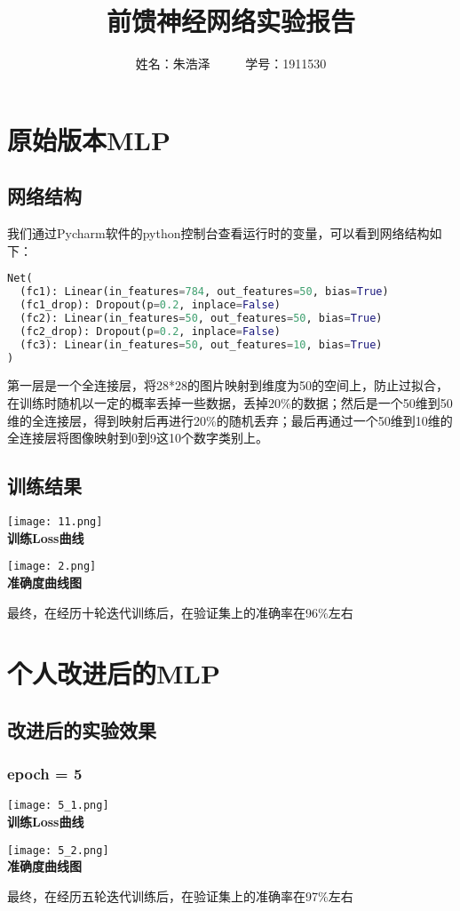 \documentclass{article}
\begin{document}
\title{\textbf{前馈神经网络实验报告}}
\author{姓名：朱浩泽 \ \ \ \ \ 学号：1911530}
\maketitle
\section{原始版本MLP}
\large 
\subsection{网络结构}
我们通过Pycharm软件的python控制台查看运行时的变量，可以看到网络结构如下：
\begin{lstlisting}[language = python]
Net(
  (fc1): Linear(in_features=784, out_features=50, bias=True)
  (fc1_drop): Dropout(p=0.2, inplace=False)
  (fc2): Linear(in_features=50, out_features=50, bias=True)
  (fc2_drop): Dropout(p=0.2, inplace=False)
  (fc3): Linear(in_features=50, out_features=10, bias=True)
)
\end{lstlisting}
第一层是一个全连接层，将28*28的图片映射到维度为50的空间上，防止过拟合，在训练时随机以一定的概率丢掉一些数据，丢掉20\%的数据；然后是一个50维到50维的全连接层，得到映射后再进行20\%的随机丢弃；最后再通过一个50维到10维的全连接层将图像映射到0到9这10个数字类别上。
\subsection{训练结果}
\begin{center}
   \texttt{[image: 11.png]}\\
   \normalsize{\textbf{训练Loss曲线}}
\end{center}
\begin{center}
   \texttt{[image: 2.png]}\\
   \normalsize{\textbf{准确度曲线图}}
\end{center}
最终，在经历十轮迭代训练后，在验证集上的准确率在96\%左右
\section{个人改进后的MLP}
\subsection{改进后的实验效果}
\subsubsection{epoch = 5}
\begin{center}
   \texttt{[image: 5\_1.png]}\\
   \normalsize{\textbf{训练Loss曲线}}
\end{center}
\begin{center}
   \texttt{[image: 5\_2.png]}\\
   \normalsize{\textbf{准确度曲线图}}
\end{center}
最终，在经历五轮迭代训练后，在验证集上的准确率在97\%左右
\end{document}

